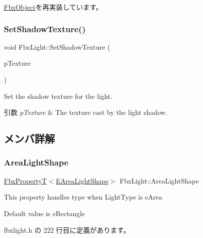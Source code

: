 \hyperlink{class_fbx_object_a6d30a5d00400039a248977cf9f9255b2}{Fbx\+Object}を再実装しています。

\mbox{\label{class_fbx_light_af6ea79f113aa9ba55bcbfa98e36d9bfe}} 
\subsubsection{\texorpdfstring{Set\+Shadow\+Texture()}{SetShadowTexture()}}
{\footnotesize\ttfamily void Fbx\+Light\+::\+Set\+Shadow\+Texture (\begin{DoxyParamCaption}\item[{\hyperlink{class_fbx_texture}{Fbx\+Texture} $\ast$}]{p\+Texture }\end{DoxyParamCaption})}

Set the shadow texture for the light. 
\begin{DoxyParams}{引数}
{\em p\+Texture} & The texture cast by the light shadow. \\
\hline
\end{DoxyParams}


\subsection{メンバ詳解}
\mbox{\label{class_fbx_light_a2d2ad2128f1ae61151c15d7de259d2e8}} 
\subsubsection{\texorpdfstring{Area\+Light\+Shape}{AreaLightShape}}
{\footnotesize\ttfamily \hyperlink{class_fbx_property_t}{Fbx\+PropertyT}$<$\hyperlink{class_fbx_light_a9bc60eabc41255f46f35d1f6acd274cd}{E\+Area\+Light\+Shape}$>$ Fbx\+Light\+::\+Area\+Light\+Shape}

This property handles type when Light\+Type is e\+Area

Default value is e\+Rectangle 

 fbxlight.\+h の 222 行目に定義があります。

\mbox{\label{class_fbx_light_aef1e933e3a3baea5ad804868750cbd04}} 
